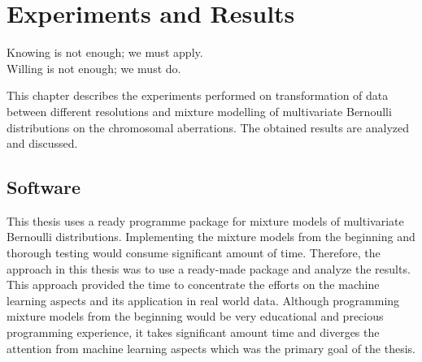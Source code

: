 \chapter{Experiments and Results}
\label{ch:experiments}

\begin{fquote}Knowing is not enough; we must apply. \\ Willing is not enough; we must do.  \end{fquote} 

\begin{synopsis}
This chapter describes the experiments performed on transformation of data between different resolutions and mixture modelling of multivariate Bernoulli distributions on the chromosomal aberrations. The obtained results are analyzed and discussed.
\end{synopsis}

\section{Software}
\label{s:software}
This thesis uses a ready programme package for mixture models of multivariate Bernoulli distributions. Implementing the mixture models from the beginning and thorough testing would consume significant amount of time. Therefore, the approach in this thesis was to use a ready-made package and analyze the results. This approach provided the time to concentrate the efforts on the machine learning aspects and its application in real world data. Although programming mixture models from the beginning would be very educational and precious programming experience, it takes significant amount time and diverges the attention from machine learning aspects which was the primary goal of the thesis.

